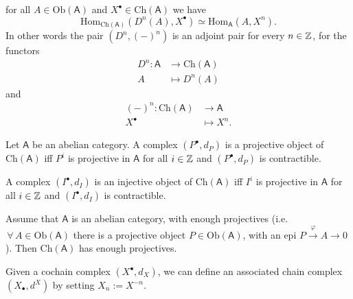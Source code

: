 \begin{lem}
	for all $A \in \mathrm{Ob} \left(\mathsf{A}\right)$ and $X^\bullet \in \mathrm{Ch}(\mathsf{A})$ we have
	\begin{equation}
		\mathrm{Hom}_{\mathrm{Ch}(\mathsf{A})} \left( D^n(A), X^\bullet \right) \simeq
		\mathrm{Hom}_{\mathsf{A}} \left( A, X^n \right)
	.\end{equation} 
	In other words the pair $(D^n, (-)^n)$ is an adjoint pair for every $n \in \mathbb{Z}$, for the functors
	\begin{align}
		D^n: \mathsf{A} &\to \mathrm{Ch}(\mathsf{A}) \\
		A &\mapsto D^n(A)
	\end{align} 
	and
	\begin{align}
		(-)^n: \mathrm{Ch}(\mathsf{A}) &\to \mathsf{A} \\
		X^\bullet &\mapsto X^n
	.\end{align} 
\end{lem} 

\begin{prop}
	Let $\mathsf{A}$ be an abelian category.
	A complex $\left( P^{\bullet}, d_{P} \right)$ is a projective object of
	$\mathrm{Ch}(\mathsf{A})$ iff $P^i$ is projective in $\mathsf{A}$ for all
	$i \in \mathbb{Z}$ and $\left( P^{\bullet}, d_{P} \right)$ is contractible.

	A complex $\left( I^{\bullet}, d_{I} \right)$ is an injective object of
	$\mathrm{Ch}(\mathsf{A})$ iff $I^i$ is projective in $\mathsf{A}$ for all
	$i \in \mathbb{Z}$ and $\left( I^{\bullet}, d_{I} \right)$ is contractible.
\end{prop} 

\begin{lem}
	Assume that $\mathsf{A}$ is an abelian category, with enough
	projectives (i.e. $\,\forall\, A \in \mathrm{Ob} \left(\mathsf{A}\right)$ there is a
	projective object $P \in \mathrm{Ob} \left(\mathsf{A}\right)$, with an epi
	$P \xrightarrow{\varphi} A \to 0$).
	Then $\mathrm{Ch}(\mathsf{A})$ has enough projectives.
\end{lem} 

\begin{rem}[]
	Given a cochain complex $\left( X^{\bullet}, d_{X} \right)$, we can define an associated
	chain complex $\left( X_{\bullet}, d^{X} \right)$ by setting $X_n := X^{-n}$.
\end{rem}

